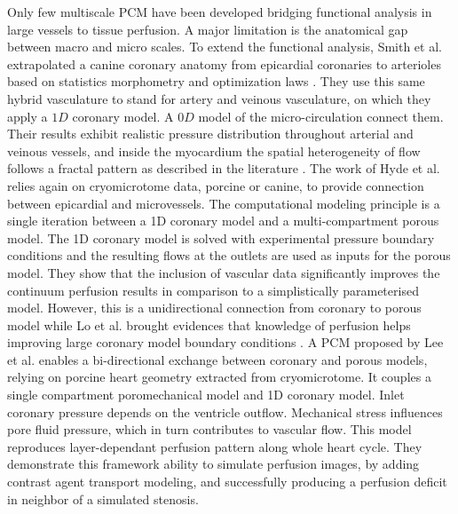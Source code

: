 \documentclass[journal]{IEEEtran}
\begin{document}
Only few multiscale PCM have been developed bridging functional analysis in large vessels to tissue perfusion. 
A major limitation is the anatomical gap between macro and micro scales. 
To extend the functional analysis, Smith et al. extrapolated a canine coronary anatomy from epicardial coronaries to arterioles based on statistics morphometry and optimization laws \cite{smith2000generation}. They use this same hybrid vasculature to stand for artery and veinous vasculature, on which they apply a $1D$ coronary model. A $0D$ model of the micro-circulation connect them. Their results exhibit realistic pressure distribution throughout arterial and veinous vessels, and inside the myocardium the spatial heterogeneity of flow follows a fractal pattern as described in the literature \cite{bassingthwaighte1989fractal}.
The work of Hyde et al. \cite{hyde2014multi} relies again on cryomicrotome data, porcine or canine, to provide connection between epicardial and microvessels. %
The computational modeling principle is a single iteration between a 1D coronary model and a multi-compartment porous model. The 1D coronary model is solved with experimental pressure boundary conditions %
and the resulting flows at the outlets are used as inputs for the porous model. They show that the inclusion of vascular data significantly improves the continuum perfusion results in comparison to a simplistically parameterised model. However, this is a unidirectional connection from coronary to porous model while Lo et al. brought evidences that knowledge of perfusion helps improving large coronary model boundary conditions \cite{Lo2019cmbe}. %
A PCM proposed by Lee et al. \cite{lee2015multiscale} enables a bi-directional exchange between coronary and porous models, relying on porcine heart geometry extracted from cryomicrotome. %
It couples a single compartment poromechanical model and 1D coronary model. Inlet coronary pressure depends on the ventricle outflow. Mechanical stress %
influences pore fluid pressure, which in turn contributes to vascular flow. This model reproduces layer-dependant perfusion pattern along whole heart cycle. %
They demonstrate this framework ability to simulate perfusion images, by adding contrast agent transport modeling, and successfully producing a perfusion deficit in neighbor of a simulated stenosis. 
\end{document}
